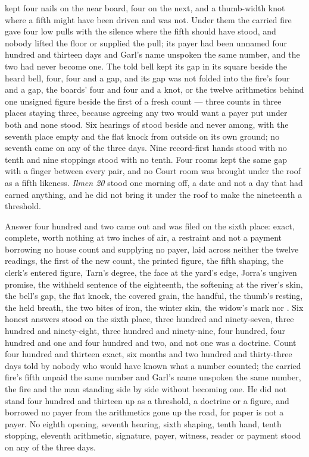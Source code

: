  kept four nails on the near board, four on the next, and a thumb-width knot where a fifth might have been driven and was not. Under them the carried fire gave four low pulls with the silence where the fifth should have stood, and nobody lifted the floor or supplied the pull; its payer had been unnamed four hundred and thirteen days and Garl's name unspoken the same number, and the two had never become one. The told bell kept its gap in its square beside the heard bell, four, four and a gap, and its gap was not folded into the fire's four and a gap, the boards' four and four and a knot, or the twelve arithmetics behind one unsigned figure beside the first of a fresh count --- three counts in three places staying three, because agreeing any two would want a payer put under both and none stood. Six hearings of  stood beside and never among, with the seventh place empty and the flat knock from  outside on its own ground; no seventh came on any of the three days. Nine record-first hands stood with no tenth and nine stoppings stood with no tenth. Four rooms kept the same gap with a finger between every pair, and no Court room was brought under the roof as a fifth likeness. \emph{Ilmen 20} stood one morning off, a date and not a day that had earned anything, and he did not bring it under the roof to make the nineteenth a threshold.

Answer four hundred and two came out and was filed on the sixth place: exact, complete, worth nothing at two inches of air, a restraint and not a payment borrowing no house count and supplying no payer, laid across neither the twelve readings, the first of the new count, the printed figure, the fifth shaping, the clerk's entered figure, Tarn's degree, the face at the yard's edge, Jorra's ungiven promise, the withheld sentence of the eighteenth, the softening at the river's skin, the bell's gap, the flat knock, the covered grain, the handful, the thumb's resting, the held breath, the two bites of iron, the winter skin, the widow's mark nor . Six honest answers stood on the sixth place, three hundred and ninety-seven, three hundred and ninety-eight, three hundred and ninety-nine, four hundred, four hundred and one and four hundred and two, and not one was a doctrine. Count four hundred and thirteen exact, six months and two hundred and thirty-three days told by nobody who would have known what a number counted; the carried fire's fifth unpaid the same number and Garl's name unspoken the same number, the fire and the man standing side by side without becoming one. He did not stand four hundred and thirteen up as a threshold, a doctrine or a figure, and borrowed no payer from the arithmetics gone up the road, for paper is not a payer. No eighth opening, seventh hearing, sixth shaping, tenth hand, tenth stopping, eleventh arithmetic, signature, payer, witness, reader or payment stood on any of the three days.

